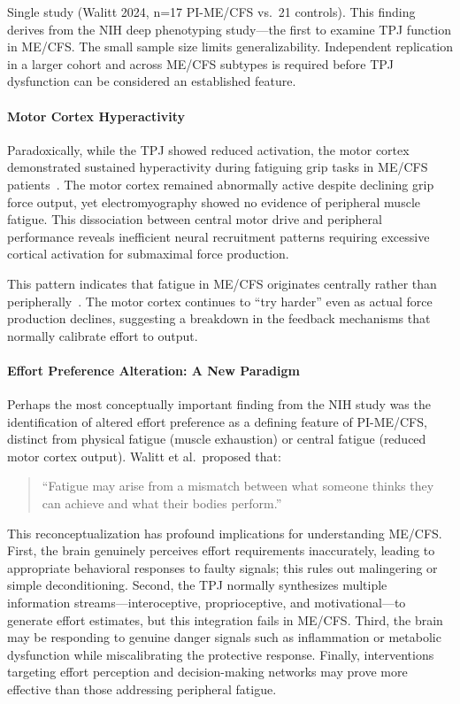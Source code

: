 \begin{warning}
Single study (Walitt 2024, n=17 PI-ME/CFS vs.\ 21 controls). This finding derives from the NIH deep phenotyping study---the first to examine TPJ function in ME/CFS. The small sample size limits generalizability. Independent replication in a larger cohort and across ME/CFS subtypes is required before TPJ dysfunction can be considered an established feature.
\end{warning}

\paragraph{Motor Cortex Hyperactivity}
Paradoxically, while the TPJ showed reduced activation, the motor cortex demonstrated sustained hyperactivity during fatiguing grip tasks in ME/CFS patients~\cite{walitt2024deep}. The motor cortex remained abnormally active despite declining grip force output, yet electromyography showed no evidence of peripheral muscle fatigue. This dissociation between central motor drive and peripheral performance reveals inefficient neural recruitment patterns requiring excessive cortical activation for submaximal force production.

This pattern indicates that fatigue in ME/CFS originates centrally rather than peripherally~\cite{walitt2024deep}. The motor cortex continues to ``try harder'' even as actual force production declines, suggesting a breakdown in the feedback mechanisms that normally calibrate effort to output.

\paragraph{Effort Preference Alteration: A New Paradigm}
Perhaps the most conceptually important finding from the NIH study was the identification of altered effort preference as a defining feature of PI-ME/CFS, distinct from physical fatigue (muscle exhaustion) or central fatigue (reduced motor cortex output). Walitt et al.\ proposed that:

\begin{quote}
``Fatigue may arise from a mismatch between what someone thinks they can achieve and what their bodies perform.''
\end{quote}

This reconceptualization has profound implications for understanding ME/CFS. First, the brain genuinely perceives effort requirements inaccurately, leading to appropriate behavioral responses to faulty signals; this rules out malingering or simple deconditioning. Second, the TPJ normally synthesizes multiple information streams---interoceptive, proprioceptive, and motivational---to generate effort estimates, but this integration fails in ME/CFS. Third, the brain may be responding to genuine danger signals such as inflammation or metabolic dysfunction while miscalibrating the protective response. Finally, interventions targeting effort perception and decision-making networks may prove more effective than those addressing peripheral fatigue.

